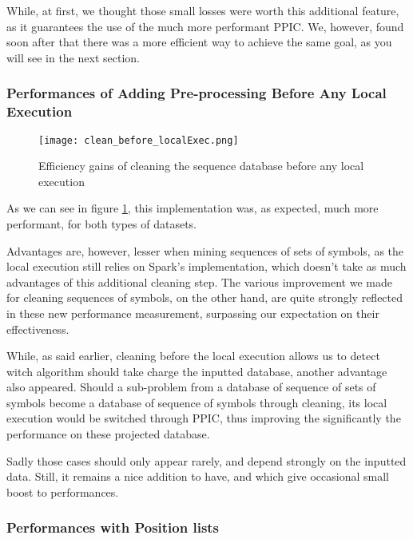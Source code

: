 \documentclass{eplmastersthesis}
\begin{document}
While, at first, we thought those small losses were worth this additional feature, as it guarantees the use of the much more performant PPIC. We, however, found soon after that there was a more efficient way to achieve the same goal, as you will see in the next section.

\subsubsection{Performances of Adding Pre-processing Before Any Local Execution}

\begin{figure}[h]
  \centering
  \texttt{[image: clean\_before\_localExec.png]}
  \caption{Efficiency gains of cleaning the sequence database before any local execution}
  \label{fig:cleaning_before_local_exec}
\end{figure}

As we can see in figure \ref{fig:cleaning_before_local_exec}, this implementation was, as expected, much more performant, for both types of datasets. \newline

Advantages are, however, lesser when mining sequences of sets of symbols, as the local execution still relies on Spark's implementation, which doesn't take as much advantages of this additional cleaning step. The various improvement we made for cleaning sequences of symbols, on the other hand, are quite strongly reflected in these new performance measurement, surpassing our expectation on their effectiveness.

While, as said earlier, cleaning before the local execution allows us to detect witch algorithm should take charge the inputted database, another advantage also appeared. Should a sub-problem from a database of sequence of sets of symbols become a database of sequence of symbols through cleaning, its local execution would be switched through PPIC, thus improving the significantly the performance on these projected database. \newline

Sadly those cases should only appear rarely, and depend strongly on the inputted data. Still, it remains a nice addition to have, and which give occasional small boost to performances.

\subsubsection{Performances with Position lists}
\end{document}
